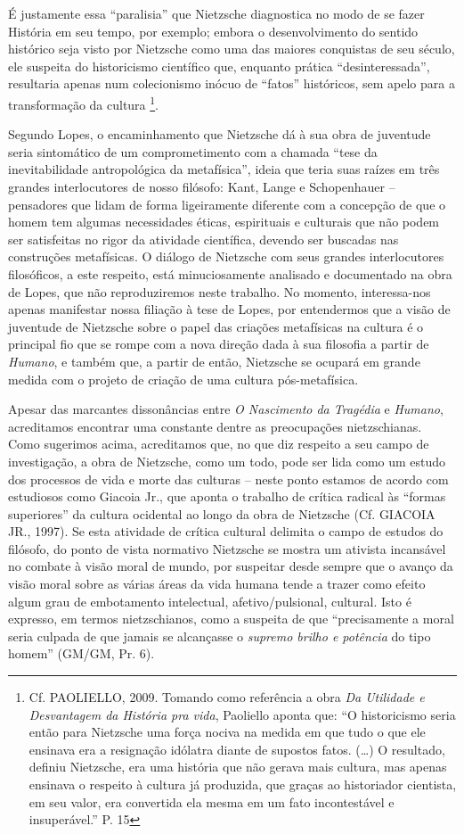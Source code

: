 \documentclass[
	12pt,				%
	openright,			%
	oneside,			%
	a4paper,			%
	english,			%
	french,				%
	spanish,			%
	brazil				%
	]{abntex2}
\newcommand{\Hum}{\textit{Humano}\xspace}
\begin{document}
É justamente essa “paralisia” que Nietzsche diagnostica no modo de se fazer História em seu tempo, por exemplo; embora o desenvolvimento do sentido histórico seja visto por Nietzsche como uma das maiores conquistas de seu século, ele suspeita do historicismo científico que, enquanto prática “desinteressada”, resultaria apenas num colecionismo inócuo de “fatos” históricos, sem apelo para a transformação da cultura
\footnote{Cf. PAOLIELLO, 2009. Tomando como referência a obra \textit{Da Utilidade e Desvantagem da História pra vida}, Paoliello aponta que: “O historicismo seria então para Nietzsche uma força nociva na medida em que tudo o que ele ensinava era a resignação idólatra diante de supostos fatos. (…) O resultado, definiu Nietzsche, era uma história que não gerava  mais cultura, mas apenas ensinava o respeito à cultura já produzida, que graças ao historiador cientista, em seu valor, era convertida ela mesma em um fato incontestável e insuperável.”  P. 15}.

	Segundo Lopes, o encaminhamento que Nietzsche dá à sua obra de juventude seria sintomático de um comprometimento com a chamada “tese da inevitabilidade antropológica da metafísica”, ideia que teria suas raízes em três grandes interlocutores de nosso filósofo: Kant, Lange e Schopenhauer – pensadores que lidam de forma ligeiramente diferente com a concepção de que o homem tem algumas necessidades éticas, espirituais e culturais que não podem ser satisfeitas no rigor da atividade científica, devendo ser buscadas nas construções metafísicas. O diálogo de Nietzsche com seus grandes interlocutores filosóficos, a este respeito, está minuciosamente analisado e documentado na obra de Lopes, que não reproduziremos neste trabalho. No momento, interessa-nos apenas manifestar nossa filiação à tese de Lopes, por entendermos que a visão de juventude de Nietzsche sobre o papel das criações metafísicas na cultura é o principal fio que se rompe com a nova direção dada à sua filosofia a partir de \Hum, e também que, a partir de então, Nietzsche se ocupará em grande medida com o projeto de criação de uma cultura pós-metafísica.

	Apesar das marcantes dissonâncias entre \textit{O Nascimento da Tragédia} e \Hum, acreditamos encontrar uma constante dentre as preocupações nietzschianas. Como sugerimos acima, acreditamos que, no que diz respeito a seu campo de investigação, a obra de Nietzsche, como um todo, pode ser lida como um estudo dos processos de vida e morte das culturas – neste ponto estamos de acordo com estudiosos como Giacoia Jr., que aponta o trabalho de crítica radical às “formas superiores” da cultura ocidental ao longo da obra de Nietzsche (Cf. GIACOIA JR., 1997). Se esta atividade de crítica cultural delimita o campo de estudos do filósofo, do ponto de vista normativo Nietzsche se mostra um ativista incansável no combate à visão moral de mundo, por suspeitar desde sempre que o avanço da visão moral sobre as várias áreas da vida humana tende a trazer como efeito algum grau de embotamento intelectual, afetivo/pulsional, cultural. Isto é expresso, em termos nietzschianos, como a suspeita de que “precisamente a moral seria culpada de que jamais se alcançasse o \textit{supremo brilho e potência} do tipo homem” (GM/GM, Pr. 6).
\end{document}
